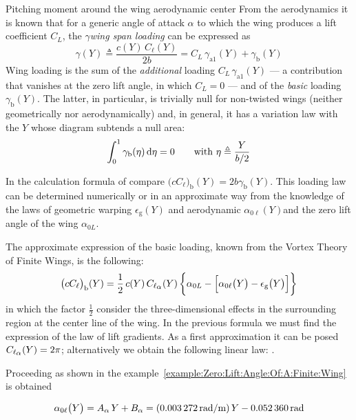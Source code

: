 \documentclass[[12pt,twoside]{book}
\begin{document}
\begin{myExampleX}{Pitching moment around the wing aerodynamic center}{}
\smallskip
From the aerodynamics it is known that for a generic angle of attack $\alpha$ to which the wing produces a lift
coefficient $C_L$,
the $\gamma$\emph{wing span loading} can be expressed as
\[
\gamma(Y) \triangleq \frac{c(Y) \, C_\ell (Y)}{2 b} = C_L \, \gamma_{\mathrm{a}1}(Y) + \gamma_\mathrm{b}(Y) 
\]
Wing loading is the sum of the  \emph{additional} loading $C_L \, \gamma_{\mathrm{a}1}(Y)$
--- a contribution that vanishes at the zero lift angle, in which $C_L=0$ ---
and of the \emph{basic} loading $\gamma_\mathrm{b}(Y)$.
The latter, in particular, is trivially null for non-twisted wings (neither geometrically nor aerodynamically)
and, in general, it has a variation law with the $Y$ whose diagram subtends a null area:
\[
\int_0^{1} \gamma_\mathrm{b}(\eta) \diff{\eta} = 0 \qquad \text{with $\eta \triangleq \dfrac{Y}{b/2}$}
\]

In the calculation formula of 
compare $\big(cC_{\ell}\big)_\mathrm{b}(Y) = 2b\gamma_\mathrm{b}(Y)$.
This loading law can be determined numerically or in an approximate way
from the knowledge of the laws of geometric warping $\epsilon_\mathrm{g}(Y)$ and aerodynamic
$\alpha_{0\ell}(Y)$and the zero lift angle of the wing $\alpha_{0L}$.

The approximate expression of the basic loading, known from the Vortex Theory of Finite Wings, is the following:
\[
\big(cC_{\ell}\big)_\mathrm{b}(Y)
  = \frac{1}{2} \, c(Y) \, C_{\ell_\mathlarger{\alpha}}(Y) \,
    \bigg\{ \alpha_{0L} - \Big[ \alpha_{0\ell}\big(Y\big) - \epsilon_\mathrm{g}\big(Y\big) \Big] \bigg\}
\]
in which the factor $\frac{1}{2}$ consider the three-dimensional effects in the surrounding region
at the center line of the wing.
%
In the previous formula we must find the expression of the law of lift gradients.
As a first approximation it can be posed
$C_{\ell_\mathlarger{\alpha}} (Y)=2\pi$; alternatively we obtain the following linear law:
.

Proceeding as shown in the example~\ref{example:Zero:Lift:Angle:Of:A:Finite:Wing}
is obtained

\[
\alpha_{0\ell} \big( Y \big) = A_{\alpha} \, Y + B_{\alpha}
  = (\SI[round-precision=5]{\myCoeffAAeroTwistWingRADMT}{\radian/\metre}) \, Y
    \SI[round-precision=4]{\myAlphaZeroLiftRootWingRAD}{\radian}
\]


\end{myExampleX}
\end{document}
